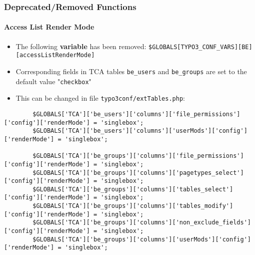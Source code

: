 
\begin{frame}[fragile]
	\frametitle{Deprecated/Removed Functions}
	\framesubtitle{Access List Render Mode}

	\lstset{basicstyle=\tiny\ttfamily}

	\begin{itemize}

		\item The following \textbf{variable} has been removed:
			\small\texttt{\$GLOBALS[TYPO3\_CONF\_VARS][BE][accessListRenderMode]}\normalsize

		\item Corresponding fields in TCA tables \texttt{be\_users} and \texttt{be\_groups}
			are set to the default value "\texttt{checkbox}"

		\item This can be changed in file \texttt{typo3conf/extTables.php}:

	\end{itemize}

	\begin{lstlisting}
		$GLOBALS['TCA']['be_users']['columns']['file_permissions']['config']['renderMode'] = 'singlebox';
		$GLOBALS['TCA']['be_users']['columns']['userMods']['config']['renderMode'] = 'singlebox';

		$GLOBALS['TCA']['be_groups']['columns']['file_permissions']['config']['renderMode'] = 'singlebox';
		$GLOBALS['TCA']['be_groups']['columns']['pagetypes_select']['config']['renderMode'] = 'singlebox';
		$GLOBALS['TCA']['be_groups']['columns']['tables_select']['config']['renderMode'] = 'singlebox';
		$GLOBALS['TCA']['be_groups']['columns']['tables_modify']['config']['renderMode'] = 'singlebox';
		$GLOBALS['TCA']['be_groups']['columns']['non_exclude_fields']['config']['renderMode'] = 'singlebox';
		$GLOBALS['TCA']['be_groups']['columns']['userMods']['config']['renderMode'] = 'singlebox';
	\end{lstlisting}

\end{frame}

